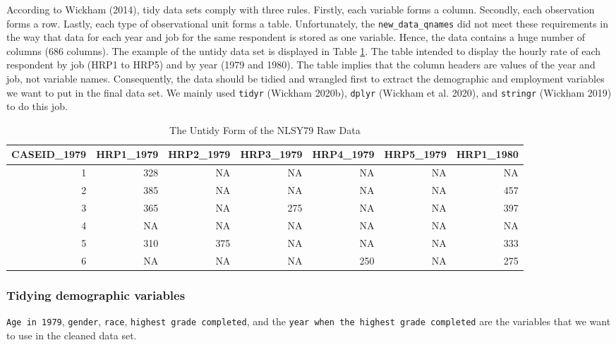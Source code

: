 \documentclass[12pt]{article}
\begin{document}
According to Wickham (2014), tidy data sets comply with three rules. Firstly, each variable forms a column. Secondly, each observation forms a row. Lastly, each type of observational unit forms a table. Unfortunately, the \texttt{new\_data\_qnames} did not meet these requirements in the way that data for each year and job for the same respondent is stored as one variable. Hence, the data contains a huge number of columns (686 columns). The example of the untidy data set is displayed in Table \ref{tab:untidy-data}. The table intended to display the hourly rate of each respondent by job (HRP1 to HRP5) and by year (1979 and 1980). The table implies that the column headers are values of the year and job, not variable names. Consequently, the data should be tidied and wrangled first to extract the demographic and employment variables we want to put in the final data set. We mainly used \texttt{tidyr} (Wickham 2020b), \texttt{dplyr} (Wickham et al. 2020), and \texttt{stringr} (Wickham 2019) to do this job.

\begin{table}

\caption{\label{tab:untidy-data}The Untidy Form of the NLSY79 Raw Data}
\centering
\begin{tabular}[t]{r|r|r|r|r|r|r}
\hline
CASEID\_1979 & HRP1\_1979 & HRP2\_1979 & HRP3\_1979 & HRP4\_1979 & HRP5\_1979 & HRP1\_1980\\
\hline
1 & 328 & NA & NA & NA & NA & NA\\
\hline
2 & 385 & NA & NA & NA & NA & 457\\
\hline
3 & 365 & NA & 275 & NA & NA & 397\\
\hline
4 & NA & NA & NA & NA & NA & NA\\
\hline
5 & 310 & 375 & NA & NA & NA & 333\\
\hline
6 & NA & NA & NA & 250 & NA & 275\\
\hline
\end{tabular}
\end{table}

\hypertarget{tidying-demographic-variables}{%
\subsubsection{Tidying demographic variables}\label{tidying-demographic-variables}}

\texttt{Age\ in\ 1979}, \texttt{gender}, \texttt{race}, \texttt{highest\ grade\ completed}, and the \texttt{year\ when\ the\ highest\ grade\ completed} are the variables that we want to use in the cleaned data set.
\end{document}
